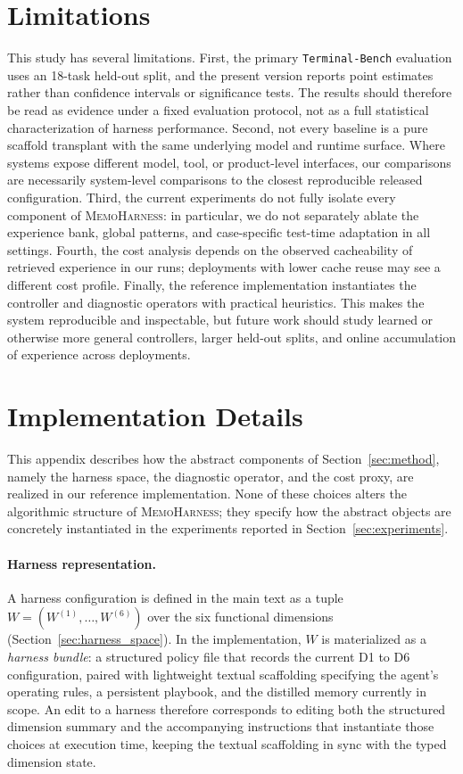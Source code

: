 \documentclass{article}
\newcommand{\method}{\textsc{MemoHarness}\xspace}
\begin{document}
\section{Limitations}
\label{sec:limitations}

This study has several limitations. First, the primary
\texttt{Terminal-Bench} evaluation uses an 18-task held-out split, and
the present version reports point estimates rather than confidence
intervals or significance tests. The results should therefore be read as
evidence under a fixed evaluation protocol, not as a full statistical
characterization of harness performance. Second, not every baseline is a
pure scaffold transplant with the same underlying model and runtime
surface. Where systems expose different model, tool, or product-level
interfaces, our comparisons are necessarily system-level comparisons to
the closest reproducible released configuration. Third, the current
experiments do not fully isolate every component of \method: in
particular, we do not separately ablate the experience bank, global
patterns, and case-specific test-time adaptation in all settings. Fourth,
the cost analysis depends on the observed cacheability of retrieved
experience in our runs; deployments with lower cache reuse may see a
different cost profile. Finally, the reference implementation
instantiates the controller and diagnostic operators with practical
heuristics. This makes the system reproducible and inspectable, but
future work should study learned or otherwise more general controllers,
larger held-out splits, and online accumulation of experience across
deployments.

\section{Implementation Details}
\label{app:implementation_details}

This appendix describes how the abstract components of
Section~\ref{sec:method}, namely the harness space, the diagnostic
operator, and the cost proxy, are realized in our reference
implementation. None of these choices alters the algorithmic structure
of \method; they specify how the abstract objects are concretely
instantiated in the experiments reported in
Section~\ref{sec:experiments}.

\paragraph{Harness representation.}
A harness configuration is defined in the main text as a tuple
$W = (W^{(1)}, \ldots, W^{(6)})$ over the six functional dimensions
(Section~\ref{sec:harness_space}). In the implementation, $W$ is
materialized as a \emph{harness bundle}: a structured policy file that
records the current D1 to D6 configuration, paired with lightweight
textual scaffolding specifying the agent's operating rules, a
persistent playbook, and the distilled memory currently in scope. An
edit to a harness therefore corresponds to editing both the structured
dimension summary and the accompanying instructions that instantiate
those choices at execution time, keeping the textual scaffolding in
sync with the typed dimension state.
\end{document}
